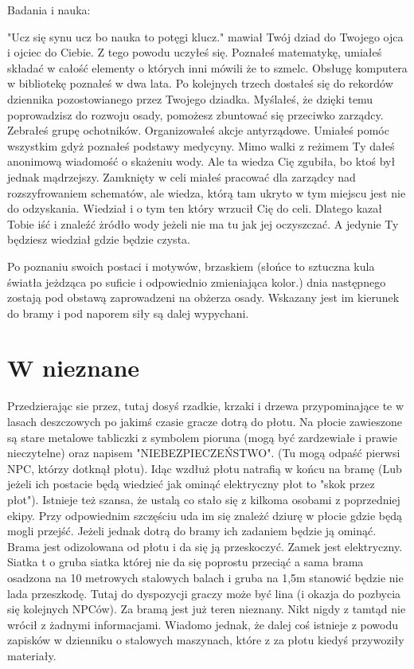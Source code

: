 \documentclass{article}
\begin{document}
    Badania i nauka:

    \begin{tcolorbox}
        \ttfamily
        "Ucz się synu ucz bo nauka to potęgi klucz." mawiał Twój dziad do Twojego ojca i ojciec do Ciebie. Z tego powodu uczyłeś się. Poznałeś matematykę, umiałeś składać w całość elementy o których inni mówili że to szmelc. Obsługę komputera w bibliotekę poznałeś w dwa lata. Po kolejnych trzech dostałeś się do rekordów dziennika pozostowianego przez Twojego dziadka. Myślałeś, że dzięki temu poprowadzisz do rozwoju osady, pomożesz zbuntować się przeciwko zarządcy. Zebrałeś grupę ochotników. Organizowałeś akcje antyrządowe. Umiałeś pomóc wszystkim gdyż poznałeś podstawy medycyny. Mimo walki z reżimem Ty dałeś anonimową wiadomość o skażeniu wody. Ale ta wiedza Cię zgubiła, bo ktoś był jednak mądrzejszy. Zamknięty w celi miałeś pracować dla zarządcy nad rozszyfrowaniem schematów, ale wiedza, którą tam ukryto w tym miejscu jest nie do odzyskania. Wiedział i o tym ten który wrzucił Cię do celi. Dlatego kazał Tobie iść i znaleźć żródło wody jeżeli nie ma tu jak jej oczyszczać. A jedynie Ty będziesz wiedział gdzie będzie czysta.
    \end{tcolorbox}

    \bigskip

    Po poznaniu swoich postaci i motywów, brzaskiem (słońce to sztuczna kula światła jeżdząca po suficie i odpowiednio zmieniająca kolor.) dnia następnego zostają pod obstawą zaprowadzeni na obżerza osady. Wskazany jest im kierunek do bramy i pod naporem siły są dalej wypychani.

    \section{W nieznane}

    Przedzierając sie przez, tutaj dosyś rzadkie, krzaki i drzewa przypominające te w lasach deszczowych po jakimś czasie gracze dotrą do płotu. Na płocie zawieszone są stare metalowe tabliczki z symbolem pioruna (mogą być zardzewiałe i prawie nieczytelne) oraz napisem "NIEBEZPIECZEŃSTWO". (Tu mogą odpaść pierwsi NPC, którzy dotknął płotu). Idąc wzdłuż płotu natrafią w końcu na bramę (Lub jeżeli ich postacie będą wiedzieć jak ominąć elektryczny płot to "skok przez płot"). Istnieje też szansa, że ustalą co stało się z kilkoma osobami z poprzedniej ekipy. Przy odpowiednim szczęściu uda im się znależć dziurę w płocie gdzie będą mogli przejść. Jeżeli jednak dotrą do bramy ich zadaniem będzie ją ominąć. Brama jest odizolowana od płotu i da się ją przeskoczyć. Zamek jest elektryczny. Siatka t o gruba siatka której nie da się poprostu przeciąć a sama brama osadzona na 10 metrowych stalowych balach i gruba na 1,5m stanowić będzie nie lada przeszkodę. Tutaj do dyspozycji graczy może być lina (i okazja do pozbycia się kolejnych NPCów). Za bramą jest już teren nieznany. Nikt nigdy z tamtąd nie wrócił z żadnymi informacjami. Wiadomo jednak, że dalej coś istnieje z powodu zapisków w dzienniku o stalowych maszynach, które z za płotu kiedyś przywoziły materiały.
\end{document}
